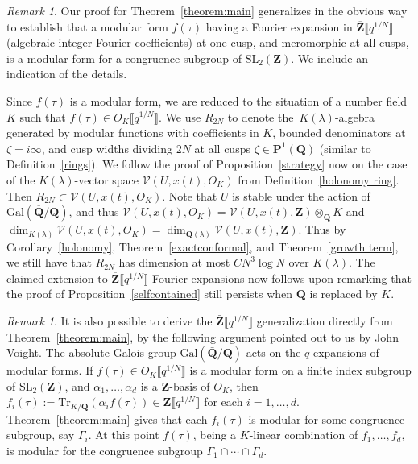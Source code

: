 \documentclass[10pt]{amsart}
\renewcommand\setminus{\smallsetminus}
\def\Z{\mathbf{Z}}
\def\Q{\mathbf{Q}}
\theoremstyle{remark}
\newtheorem{remark}[subsubsection]{Remark}
\numberwithin{equation}{subsection}
\def\C{\mathbf{C}}
\def\Gal{\mathrm{Gal}}
\def\SL{\mathrm{SL}}
\begin{document}
\begin{remark}\label{remark:numberfield}
Our proof for Theorem~\ref{theorem:main}  generalizes in the obvious way to establish that a modular form $f(\tau)$ having a Fourier expansion in $\overline{\Z} \llbracket q^{1/N}\rrbracket$ (algebraic integer Fourier coefficients) at one cusp, and meromorphic at all cusps, is a modular form for a congruence subgroup of $\SL_2(\Z)$. We include an indication of the details.

Since $f(\tau)$ is a modular form, we are reduced to the situation of a number field $K$ such that $f(\tau) \in O_K\llbracket q^{1/N}\rrbracket$. We use $R_{2N}$ to denote the~$K(\lambda)$-algebra generated by modular functions with coefficients in $K$, bounded denominators at~$\zeta = i \infty$, and cusp widths dividing $2N$ at all cusps $\zeta \in \mathbf{P}^1(\Q)$ (similar to Definition~\ref{rings}). 
We follow the proof of Proposition~\ref{strategy} now on the case of the $K(\lambda)$-vector space
 $\mathcal{V}(U,x(t),O_K)$ from Definition~\ref{holonomy ring}. %
 Then $R_{2N}  \subset \mathcal{V}(U,x(t),O_K)$.
Note that $U$ is stable under the action of $\Gal(\overline{\Q}/\Q)$, and thus $\mathcal{V}(U,x(t),O_K)= \mathcal{V}(U,x(t),\Z)\otimes_{\Q} K$ and $\dim_{K(\lambda)}\mathcal{V}(U,x(t),O_K)=\dim_{\Q(\lambda)}\mathcal{V}(U,x(t),\Z)$. Thus by Corollary~\ref{holonomy}, Theorem~\ref{exactconformal}, and Theorem~\ref{growth term}, we still have that $R_{2N}$ has dimension at most $CN^3\log N$ over $K(\lambda)$.
The claimed extension to $\overline{\Z}\llbracket q^{1/N} \rrbracket$ Fourier expansions now follows upon remarking that the proof of Proposition~\ref{selfcontained} still persists when $\Q$  is replaced by $K$.
\end{remark}

\begin{remark} \label{Zbar reduction}
It is also possible to derive the $\bar{\Z}\llbracket q^{1/N} \rrbracket$ generalization directly from Theorem~\ref{theorem:main}, by the following argument pointed out to us
by John Voight. The absolute Galois group $\mathrm{Gal}(\bar{\Q}/\Q)$ acts on the $q$-expansions of modular forms. If $f(\tau) \in O_K\llbracket q^{1/N} \rrbracket$ is a modular form on a finite index subgroup of $\SL_2(\Z)$, and $\alpha_1, \ldots, \alpha_d$ is a $\Z$-basis of $O_K$, then $f_i(\tau) := \mathrm{Tr}_{K/\Q}( \alpha_i  f(\tau) ) \in \Z\llbracket q^{1/N} \rrbracket$ for each $i = 1,\ldots, d$. Theorem~\ref{theorem:main} gives that each $f_i(\tau)$ is modular for some congruence subgroup, say $\Gamma_i$. At this point $f(\tau)$, being a $K$-linear combination of $f_1,\ldots,f_d$, is modular for the congruence subgroup $\Gamma_1 \cap \cdots \cap \Gamma_d$.

\end{remark}
\end{document}
